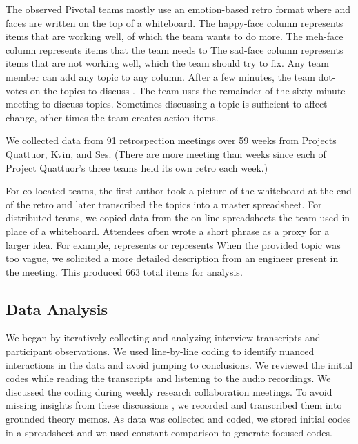 The observed Pivotal teams mostly use an emotion-based retro format where   and  faces are written on the top of a whiteboard. The happy-face column represents items that are working well, of which the team wants to do more. The meh-face column represents  items that the team needs to  The sad-face column represents items that are not working well, which the team should try to fix. Any team member can add any topic to any column. After a few minutes, the team dot-votes on the topics to discuss \cite{DerbyAgileRetrospectives}. The team uses the remainder of the sixty-minute meeting to discuss topics. Sometimes discussing a topic is sufficient to affect change, other times the team creates action items. 

We collected data from 91 retrospection meetings over 59 weeks from Projects Quattuor, Kvin, and Ses. (There are more meeting than weeks since each of Project Quattuor's three teams held its own retro each week.)

For co-located teams, the first author took a picture of the whiteboard at the end of the retro and later transcribed the topics into a master spreadsheet. For distributed teams, we copied data from the on-line spreadsheets the team used in place of a whiteboard. Attendees often wrote a short phrase as a proxy for a larger idea. For example,  represents  or  represents  When the provided topic was too vague, we solicited a more detailed description from an engineer present in the meeting. This produced 663 total items for analysis. 
\subsection{Data Analysis}
We began by iteratively collecting and analyzing interview transcripts and participant observations. We used line-by-line coding \cite{Charmaz} to identify nuanced interactions in the data and avoid jumping to conclusions. We reviewed the initial codes while reading the transcripts and listening to the audio recordings. We discussed the coding during weekly research collaboration meetings. To avoid missing insights from these discussions \cite{GlaserTheoreticalSensitivity}, we recorded and transcribed them into grounded theory memos. As data was collected and coded, we stored initial codes in a spreadsheet and we used constant comparison to generate focused codes.

